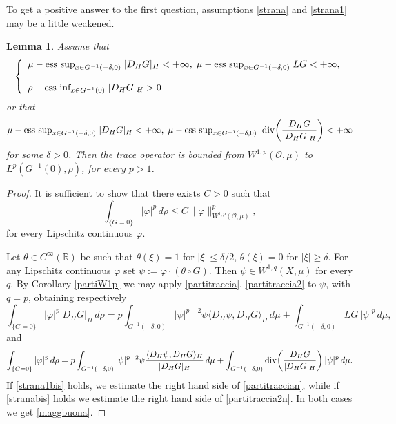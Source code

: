 \documentclass[reqno,twoside,12pt]{amsart}
\newtheorem{Lemma}[Theorem]{Lemma}
\begin{document}
To get a positive answer to the first question, 
assumptions \eqref{strana} and \eqref{strana1} may be a little weakened. 
 
\begin{Lemma}
Assume that 
\begin{equation}
 \label{strana1bis}
\left\{ \begin{array}{l}
\mu-\mbox{\rm ess sup}_{x\in  G^{-1}(-\delta, 0)} \; |D_HG|_H <+\infty, \;\mu-\mbox{\rm ess sup}_{x\in  G^{-1}(-\delta, 0)}\;
 LG   <+\infty, 
 \\
 \\
 \rho -\mbox{\rm ess  inf}_{x\in  G^{-1}( 0)} \; |D_HG|_H >0
 \end{array}\right. 
 \end{equation}
 or that
 \begin{equation}
 \label{stranabis}
\mu-\mbox{\rm ess sup}_{x\in G^{-1}(-\delta, 0)} \;|D_HG|_H <+\infty, \;
\mu-\mbox{\rm ess sup}_{x\in G^{-1}(-\delta, 0)} \;\;{\operatorname{div}} \bigg( \frac{D_HG}{|D_HG|_H} \bigg)<+\infty
  \end{equation}
for some $\delta >0$. Then the trace operator is bounded from $W^{1,p}({\mathcal O}, \mu)$ to $L^p(G^{-1}(0), \rho)$, for every $p>1$. 
\end{Lemma}
\begin{proof} It is sufficient to show that there exists $C>0$ such that 
\begin{equation}
\label{maggbuona}
\int_{\{G=0\}} | \varphi|^p   \,d\rho \leq C \|\varphi\|_{W^{1,p}({\mathcal O}, \mu)}^p  ,
\end{equation}
for every Lipschitz continuous $\varphi$. 

Let $\theta\in C^{\infty}({\mathbb R})$ be such that $\theta(\xi) = 1$ for $|\xi |\leq \delta/2$, $\theta(\xi) =0$ for $|\xi |\geq \delta$. 
For any Lipschitz continuous $\varphi$  set   $\psi:= \varphi \cdot (\theta\circ G)$. Then $\psi \in  W^{1,q}(X, \mu)$ for every $q$. By Corollary \ref{partiW1p} we may apply  \eqref{partitraccia}, \eqref{partitraccia2} to 
$\psi$, with $q=p$, obtaining respectively
\begin{equation}
\label{partitraccian}
  \int_{\{G=0\}} | \varphi|^p |D_HG|_H  \,d\rho  =  p   \int_{G^{-1}(-\delta, 0)}  |\psi|^{p-2}\psi \langle D_H\psi, D_HG\rangle_H   \,d\mu +  \int_{G^{-1}(-\delta, 0)} LG \,|\psi|^p \,d\mu , 
  \end{equation}
and 
\begin{equation}
\label{partitraccia2n}
 \int_{\{G=0\}} | \varphi|^p   \,d\rho = {\displaystyle} p \int_{G^{-1}(-\delta, 0)}  |\psi|^{p-2}\psi\frac{\langle D_H\psi, D_HG\rangle_H }{|D_HG|_H }  \,d\mu + \int_{G^{-1}(-\delta, 0)} {\operatorname{div}} \bigg(\frac{D_HG}{|D_HG|_H}\bigg)  \,| \psi|^p \,d\mu .
\end{equation}
If \eqref{strana1bis} holds, we estimate the right hand side of   \eqref{partitraccian}, while if  \eqref{stranabis} holds we estimate the right hand side of \eqref{partitraccia2n}. In both cases we get \eqref{maggbuona}. 
 \end{proof}
 
\end{document}

